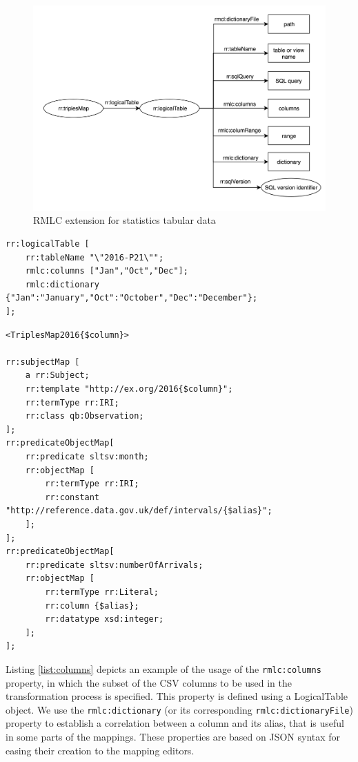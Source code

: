 \begin{figure}[h]
  \centering
  \includegraphics[width=1.0\linewidth]{figures/rmlc-iterator.png}
  \caption{RMLC extension for statistics tabular data}
  \label{fig:rmlc}
\end{figure}

\begin{lstlisting}[float,caption=Columns and dictionary properties in RMLC,frame=tlrb,label={list:columns}, columns=fullflexible]
rr:logicalTable [
    rr:tableName "\"2016-P21\"";
    rmlc:columns ["Jan","Oct","Dec"];
    rmlc:dictionary {"Jan":"January","Oct":"October","Dec":"December"};
];
\end{lstlisting}

\begin{lstlisting}[float,caption=Iterator variables in RMLC,frame=tlrb,label={list:iterator}, columns=fullflexible]
<TriplesMap2016{$column}>

rr:subjectMap [
    a rr:Subject;
    rr:template "http://ex.org/2016{$column}";
    rr:termType rr:IRI;
    rr:class qb:Observation;
];
rr:predicateObjectMap[
	rr:predicate sltsv:month;
    rr:objectMap [
    	rr:termType rr:IRI;
        rr:constant "http://reference.data.gov.uk/def/intervals/{$alias}";
    ];
];
rr:predicateObjectMap[
    rr:predicate sltsv:numberOfArrivals;
    rr:objectMap [
        rr:termType rr:Literal;
        rr:column {$alias};
        rr:datatype xsd:integer;
    ];
];
\end{lstlisting}


Listing \ref{list:columns} depicts an example of the usage of the \texttt{rmlc:columns} property, in which the subset of the CSV columns to be used in the transformation process is specified. This property is defined using a LogicalTable object. We use the \texttt{rmlc:dictionary} (or its corresponding \texttt{rmlc:dictionaryFile}) property to establish a correlation between a column and its alias, that is useful in some parts of the mappings. These properties are based on JSON syntax for easing their creation to the mapping editors.

